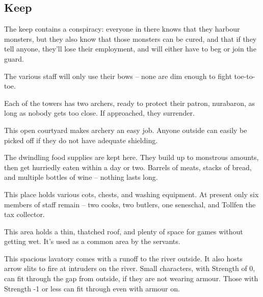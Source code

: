 \begin{multicols}{2}
\subsection{ Keep}

The keep contains a conspiracy: everyone in there knows that they harbour monsters, but they also know that those monsters can be cured, and that if they tell anyone, they'll lose their employment, and will either have to beg or join the \gls{guard}.

The various staff will only use their bows -- none are dim enough to fight toe-to-toe.



Each of the towers has two archers, ready to protect their patron, \gls{nurabaron}, as long as nobody gets too close.
If approached, they surrender.



This open courtyard makes archery an easy job.  Anyone outside can easily be picked off if they do not have adequate shielding.


The dwindling food supplies are kept here.  They build up to monstrous amounts, then get hurriedly eaten within a day or two.  Barrels of meats, stacks of bread, and multiple bottles of wine -- nothing lasts long.


This place holds various cots, chests, and washing equipment.
At present only six members of staff remain -- two cooks, two butlers, one seneschal, and Tollfen the tax collector.


This area holds a thin, thatched roof, and plenty of space for games without getting wet.
It's used as a common area by the servants.


This spacious lavatory comes with a runoff to the river outside.
It also hosts arrow slits to fire at intruders on the river.
Small characters, with Strength of 0, can fit through the gap from outside, if they are not wearing armour.
Those with Strength -1 or less can fit through even with armour on.


\end{multicols}
